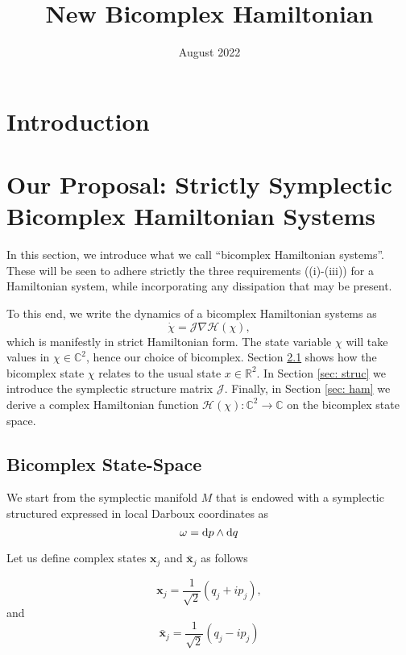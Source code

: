 \documentclass{article}
\title{New Bicomplex Hamiltonian}
\author{ }
\date{August 2022}
\begin{document}
\maketitle

\section{Introduction}


\section{Our Proposal: Strictly Symplectic Bicomplex Hamiltonian Systems }
\label{sec: bicomplex}
In this section, we introduce what we call ``bicomplex Hamiltonian systems''.  These will be seen to adhere strictly the three requirements ((i)-(iii)) for a Hamiltonian system, while incorporating any dissipation that may be present.

To this end, we write the dynamics of a bicomplex Hamiltonian systems as
\begin{equation}
\label{eq: bicomphamdes}
    \Dot{\chi}=\mathcal{J}\nabla\mathcal{H}(\chi),
\end{equation}
which is manifestly in strict Hamiltonian form.  The state variable $\chi$ will take values in $\mathcal{\chi}\in\mathbb{C}^{2}$, hence our choice of bicomplex.  Section \ref{sec: state} shows how the bicomplex state $\chi$  relates to the usual state $x \in \mathbb{R}^{2}$. In Section \ref{sec: struc} we introduce the symplectic structure  matrix $\mathcal{J}$.  Finally, in Section \ref{sec: ham} we derive a
complex Hamiltonian function $\mathcal{H}(\chi) : \mathbb{C}^{2} \to \mathbb{C}$ on the bicomplex state space.

\subsection{Bicomplex State-Space}
\label{sec: state}
We start from the symplectic manifold $M$ that is endowed with a symplectic structured expressed in local Darboux coordinates as
\begin{equation}
    \omega = \dif p \wedge \dif q
\end{equation}

Let us define complex states $\textbf{x}_j$ and $\bar{\textbf{x}}_j$ as follows

\begin{equation}
\label{eq: lad}
    \textbf{x}_j =\frac{1}{\sqrt{2}} \left(q_j+i p_j\right),
\end{equation}
and
\begin{equation}
\label{eq: ladc}
    \bar{\textbf{x}}_j = \frac{1}{\sqrt{2}}\left(q_j-ip_j\right)
\end{equation}
\end{document}
